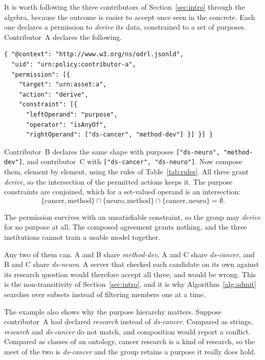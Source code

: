\documentclass[10pt,conference]{IEEEtran}
\begin{document}
It is worth following the three contributors of
Section~\ref{sec:intro} through the algebra, because the outcome is easier to
accept once seen in the concrete. Each one declares a permission to
\emph{derive} its data, constrained to a set of purposes. Contributor~A
declares the following.

\begin{lstlisting}[style=jsonld]
{ "@context": "http://www.w3.org/ns/odrl.jsonld",
  "uid": "urn:policy:contributor-a",
  "permission": [{
    "target": "urn:asset:a",
    "action": "derive",
    "constraint": [{
      "leftOperand": "purpose",
      "operator": "isAnyOf",
      "rightOperand": ["ds-cancer", "method-dev"] }] }] }
\end{lstlisting}

Contributor~B declares the same shape with purposes
\texttt{["ds-neuro", "method-dev"]}, and contributor~C with
\texttt{["ds-cancer", "ds-neuro"]}. Now compose them, element by element, using
the rules of Table~\ref{tab:rules}. All three grant \emph{derive}, so the
intersection of the permitted actions keeps it. The purpose constraints are
conjoined, which for a set-valued operand is an intersection:
\[
\{\text{cancer},\text{method}\} \cap
\{\text{neuro},\text{method}\} \cap
\{\text{cancer},\text{neuro}\} = \emptyset .
\]

The permission survives with an unsatisfiable constraint, so the group may
\emph{derive} for no purpose at all. The composed agreement grants nothing, and
the three institutions cannot train a usable model together.

Any two of them can. A and B share \emph{method-dev}, A and C share
\emph{ds-cancer}, and B and C share \emph{ds-neuro}. A server that checked each
candidate on its own against its research question would therefore accept all
three, and would be wrong. This is the non-transitivity of
Section~\ref{sec:intro}, and it is why Algorithm~\ref{alg:admit} searches over
subsets instead of filtering members one at a time.

The example also shows why the purpose hierarchy matters. Suppose contributor~A
had declared \emph{research} instead of \emph{ds-cancer}. Compared as strings,
\emph{research} and \emph{ds-cancer} do not match, and composition would report
a conflict. Compared as classes of an ontology, cancer research is a kind of
research, so the meet of the two is \emph{ds-cancer} and the group retains a
purpose it really does hold.

\end{document}
